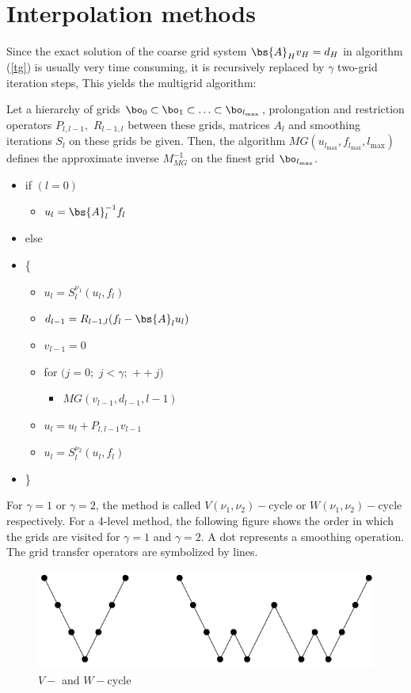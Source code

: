 \section{Interpolation methods}
Since the exact solution of the coarse grid system $\bs{A}_H v_H = d_H$ in
algorithm (\ref{tg}) is usually very time consuming, it is recursively
replaced by $\gamma$ two-grid iteration steps, This yields the multigrid
algorithm:
\begin{algorithm}
Let a hierarchy of grids $\bo_0 \subset \bo_1 \subset \hdots \subset
\bo_{l_{\max}}$, prolongation and restriction operators $P_{l,l-1},$ $R_{l-1,l}$
between these grids, matrices $A_l$ and smoothing iterations $S_l$ on these
grids be given. Then, the algorithm $MG(u_{l_{\max}},f_{l_{\max}},l_{\max})$
defines the approximate inverse $M_{MG}^{-1}$ on the finest grid
$\bo_{l_{\max}}$.
\begin{itemize}
\item[] if $(l=0)$  
\begin{itemize}
\item[]$u_l=\bs{A}_l^{-1} f_l$
\end{itemize}
\item[] else
\item[] \{
\begin{itemize}
\item[] $u_l = S_l^{\nu_1} (u_l,f_l)$
\item[] $d_{l-1} = R_{l-1,l}(f_l-\bs{A}_l u_l)$
\item[] $v_{l-1}=0$
\item[] for $(j=0;$ $j<\gamma;$ $++j)$
\begin{itemize}
\item[] $MG(v_{l-1},d_{l-1},l-1)$
\end{itemize}
\item[] $u_l = u_l+P_{l,l-1} v_{l-1}$
\item[] $u_l=S_l^{\nu_2}(u_l,f_l)$
\end{itemize}
\item[] \}
\end{itemize}
\label{4_0_1}
\end{algorithm}
For $\gamma = 1$ or $\gamma = 2$, the method is called $V(\nu_1,\nu_2)-$cycle
or $W(\nu_1,\nu_2)-$cycle respectively. For a 4-level method, the following
figure shows the order in which the grids are visited for $\gamma=1$ and
$\gamma=2$. A dot represents a smoothing operation. The grid transfer
operators are symbolized by lines.
\begin{figure}[H]
\centering
\includegraphics[width=\textwidth]{./Dsa/v_w_cycles}
\caption{$V-$ and $W-$cycle}
\end{figure}

